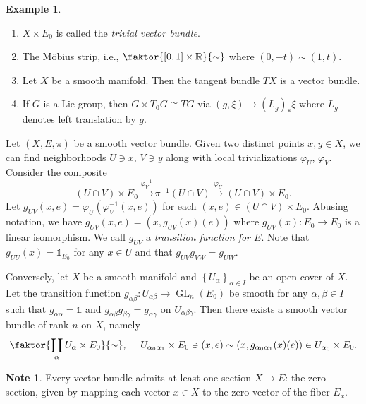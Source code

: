 \documentclass[10pt,letterpaper,cm]{nupset}
\theoremstyle{definition}
\newtheorem{exmp}[definition]{Example}
\newtheorem{note}[definition]{Note}
\theoremstyle{theorem}
\theoremstyle{remark}
\newcommand{\R}{\mathbb{R}}
\newcommand{\1}{\mathbb{1}}
\newcommand{\0}{\vec 0}
\DeclareMathOperator{\GL}{GL}
\begin{document}
\begin{exmp} $ $
\begin{enumerate}
\item $X \times E_0$ is called the \textit{trivial vector bundle}.
\item  The M\"obius strip, i.e., $\faktor{\left[0,1\right]\times \R}{\sim}$ where $\left(0, {-t}\right) \sim \left(1, t\right)$.
\item Let $X$ be a smooth manifold. Then the tangent bundle $T{X}$ is a vector bundle. 
\item If $G$ is a Lie group, then $ G \times T_0{G} \cong T{G}$ via $ \left(g, \xi\right) \mapsto \left(L_g\right)_{\ast}{\xi}$ where  $L_g$ denotes left translation by $g$. 
\end{enumerate}
\end{exmp}

\medskip

Let $\left(X, E, \pi\right)$ be a smooth vector bundle. Given two distinct points $x,y \in X$, we can find neighborhoods $U\ni x$, $V\ni y$ along with local trivializations $\varphi_U$, $\varphi_V$. Consider the composite $$ \left(U \cap V\right) \times E_0 \overset{\varphi^{-1}_V}{\longrightarrow} \pi^{-1}\left(U \cap V\right) \overset{\varphi_U}{\longrightarrow} \left(U \cap V\right) \times E_0    .$$ Let $g_{UV}(x,e) = \varphi_U(\varphi_V^{-1}(x,e))$ for each $\left(x,e\right) \in \left(U \cap V\right) \times E_0$. Abusing notation, we have $g_{UV}(x,e) = \left(x, g_{UV}(x)(e)\right)$ where $g_{UV}(x) : E_0 \to E_0$ is a linear isomorphism. We call $g_{UV}$ a \textit{transition function for $E$}. Note that $g_{UU}(x) = \1_{E_0}$ for any $x\in U$ and that $g_{UV}g_{VW} = g_{UW}$. 

\smallskip

Conversely,  let $X$ be a smooth manifold and $\left\{U_{\alpha}\right\}_{\alpha \in I}$ be an open cover of $X$. Let the transition function $g_{\alpha{\beta}} : U_{\alpha{\beta}} \to \GL_n(E_0)$ be smooth for any $\alpha, \beta \in I$ such that $g_{\alpha{\alpha}} = \1$ and $g_{\alpha{\beta}}g_{\beta{\gamma}} = g_{\alpha{\gamma}}$ on $U_{\alpha{\beta}{\gamma}}$.
 Then there exists a smooth vector bundle of rank $n$ on $X$, namely 
 \[
 \faktor{\coprod_{\alpha}{U_{\alpha} \times E_0}}{\sim}, \ \quad U_{\alpha_0{\alpha_1}} \times E_0 \ni (x,e) \sim \left(x, g_{\alpha_0{\alpha_1}}(x)(e)\right) \in U_{\alpha_0}\times E_0 .
 \]

\smallskip

\begin{note} 
 Every vector bundle admits at least one section $X\to E$: the zero section, given by mapping each vector $x \in X$ to the zero vector of the fiber $E_x$.
\end{note}
\end{document}
